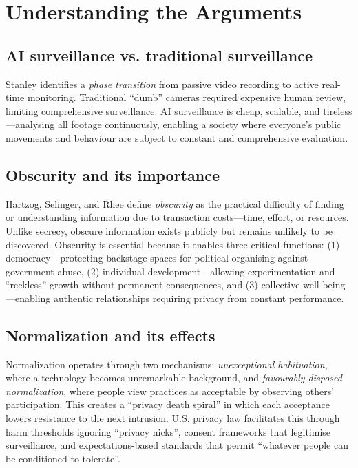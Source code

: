 \documentclass[11pt,twoside]{article}
\title{
\vspace*{2in}
\textbf{\Huge Surveillance, Normalization, and Ethics}\[1em]
\Large Reflections on Unit 5 of IDAI700\[2em]
\large Piter Garcia\\
\small IDAI700: Ethics of Artificial Intelligence\\
Rochester Institute of Technology\\
\texttt{pzg8794@rit.edu}\\[3em]
\large October 5, 2025
}
\author{}
\date{}
\begin{document}
\thispagestyle{empty}
\maketitle
\newpage

\pagestyle{fancy}

\section{Understanding the Arguments}

\subsection{AI surveillance vs. traditional surveillance}
Stanley identifies a \emph{phase transition} from passive video recording to active real-time monitoring.  Traditional ``dumb'' cameras required expensive human review, limiting comprehensive surveillance.  AI surveillance is cheap, scalable, and tireless—analysing all footage continuously, enabling a society where everyone's public movements and behaviour are subject to constant and comprehensive evaluation.

\subsection{Obscurity and its importance}
Hartzog, Selinger, and Rhee define \emph{obscurity} as the practical difficulty of finding or understanding information due to transaction costs—time, effort, or resources.  Unlike secrecy, obscure information exists publicly but remains unlikely to be discovered.  Obscurity is essential because it enables three critical functions: (1) democracy—protecting backstage spaces for political organising against government abuse, (2) individual development—allowing experimentation and \enquote{reckless} growth without permanent consequences, and (3) collective well-being—enabling authentic relationships requiring privacy from constant performance.

\subsection{Normalization and its effects}
Normalization operates through two mechanisms: \emph{unexceptional habituation}, where a technology becomes unremarkable background, and \emph{favourably disposed normalization}, where people view practices as acceptable by observing others' participation.  This creates a \enquote{privacy death spiral} in which each acceptance lowers resistance to the next intrusion.  U.S. privacy law facilitates this through harm thresholds ignoring \enquote{privacy nicks}, consent frameworks that legitimise surveillance, and expectations-based standards that permit \enquote{whatever people can be conditioned to tolerate}.
\end{document}
